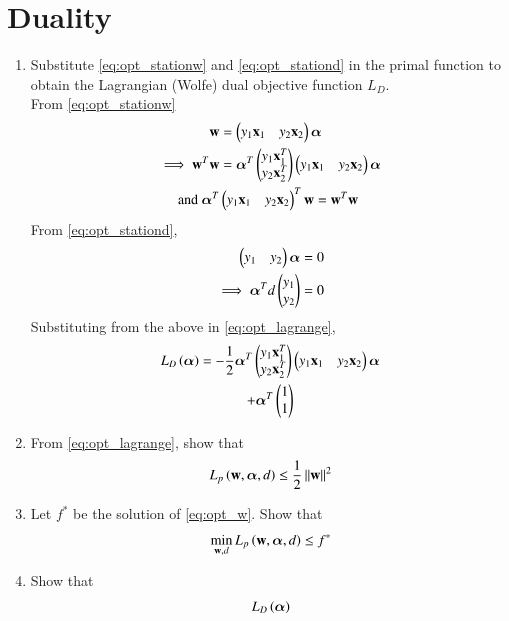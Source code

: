 \documentclass[journal,12pt,twocolumn]{IEEEtran}
\renewcommand\thesection{\arabic{section}}
\begin{document}
\section{Duality}
\begin{enumerate}[label=\thesection.\arabic*,ref=\thesection.\theenumi]

\item Substitute \eqref{eq:opt_stationw}
and \eqref{eq:opt_stationd}
in the primal function to obtain the Lagrangian 
(Wolfe) dual objective function $L_D$.  
\\
\solution From \eqref{eq:opt_stationw}
\begin{align}
\mathbf{w} &= \begin{pmatrix}y_1\mathbf{x}_1 & y_2\mathbf{x}_2\end{pmatrix}\bm{\alpha} 
\\
\implies \mathbf{w}^T\mathbf{w} &= \bm{\alpha}^T \begin{pmatrix}y_1\mathbf{x}_1^T \\ y_2\mathbf{x}_2^T\end{pmatrix}\begin{pmatrix}y_1\mathbf{x}_1 & 
y_2\mathbf{x}_2\end{pmatrix}\bm{\alpha} 
\\
\text{and } \bm{\alpha}^T &
\begin{pmatrix}y_1\mathbf{x}_1& y_2\mathbf{x}_2\end{pmatrix}^T\mathbf{w}  = \mathbf{w}^T\mathbf{w} 
\end{align}
From \eqref{eq:opt_stationd},
\begin{align}
\begin{pmatrix}y_1&y_2\end{pmatrix} \bm{\alpha}&=0
\\
\implies \bm{\alpha}^Td\begin{pmatrix}y_1 \\ y_2\end{pmatrix} &=0
\end{align}
%
Substituting from the above in \eqref{eq:opt_lagrange},
\begin{multline}
\label{eq:opt_lagrange_wolfe}
L_D\left(\bm{\alpha}\right)
= 
-\frac{1}{2}\bm{\alpha}^T \begin{pmatrix}y_1\mathbf{x}_1^T \\ y_2\mathbf{x}_2^T\end{pmatrix}\begin{pmatrix}y_1\mathbf{x}_1 & 
y_2\mathbf{x}_2\end{pmatrix}\bm{\alpha} 
\\
+\bm{\alpha}^T\begin{pmatrix}1\\1\end{pmatrix} 
\end{multline}
%
\item From \eqref{eq:opt_lagrange}, show that 
%
\begin{align}
L_p\left(\mathbf{w},\bm{\alpha},d\right)
\le \frac{1}{2}\left\Vert\mathbf{w}\right\Vert^2 
\end{align}
%
\item Let $f^*$ be the solution of \eqref{eq:opt_w}.
%
Show that 
\begin{align}
\min_{\mathbf{w},d}L_p\left(\mathbf{w},\bm{\alpha},d\right)
\le f^*
\end{align}
%
\item Show that 
\begin{align}
L_D\brak{\bm{\alpha}}

\end{align}
\end{enumerate}
\end{document}
